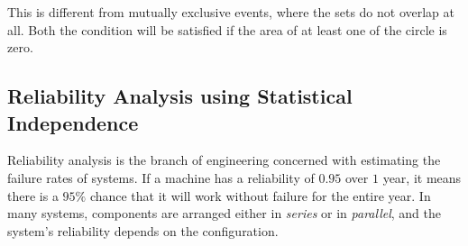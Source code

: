 \documentclass[twoside]{book}
\begin{document}
This is different from mutually exclusive events, where the sets do not overlap at all. Both the condition will be satisfied if the area of at least one of the circle is zero.

\subsection{Reliability Analysis using Statistical Independence}

Reliability analysis is the branch of engineering concerned with estimating the failure
rates of systems. If a machine has a reliability of $0.95$ over $1$ year, it means there is a $95\%$ chance that it will work without failure for the entire year. In many systems, components are arranged either in \textit{series} or in \textit{parallel}, and the system's reliability depends on the configuration.
\end{document}
